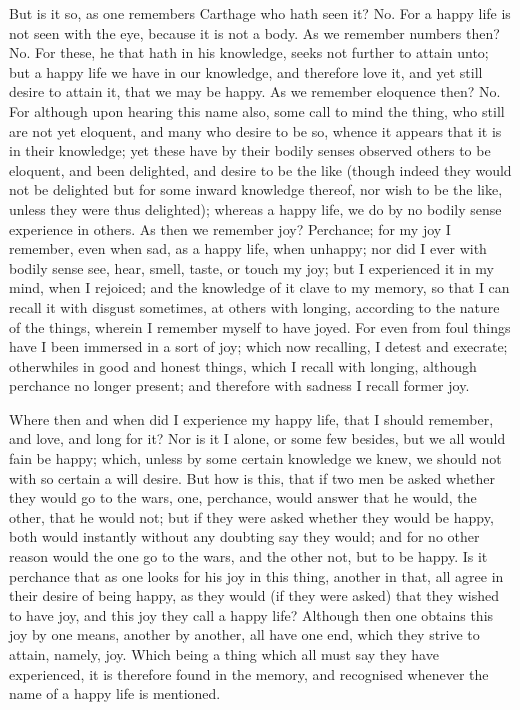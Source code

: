 \documentclass[b5paper,openright,12pt,twoside]{book}
\begin{document}
But is it so, as one remembers Carthage who hath seen it? No. For a
happy life is not seen with the eye, because it is not a body. As we
remember numbers then? No. For these, he that hath in his knowledge,
seeks not further to attain unto; but a happy life we have in our
knowledge, and therefore love it, and yet still desire to attain it,
that we may be happy. As we remember eloquence then? No. For although
upon hearing this name also, some call to mind the thing, who still are
not yet eloquent, and many who desire to be so, whence it appears that
it is in their knowledge; yet these have by their bodily senses observed
others to be eloquent, and been delighted, and desire to be the like
(though indeed they would not be delighted but for some inward knowledge
thereof, nor wish to be the like, unless they were thus delighted);
whereas a happy life, we do by no bodily sense experience in others. As
then we remember joy? Perchance; for my joy I remember, even when sad,
as a happy life, when unhappy; nor did I ever with bodily sense see,
hear, smell, taste, or touch my joy; but I experienced it in my mind,
when I rejoiced; and the knowledge of it clave to my memory, so that I
can recall it with disgust sometimes, at others with longing, according
to the nature of the things, wherein I remember myself to have joyed.
For even from foul things have I been immersed in a sort of joy; which
now recalling, I detest and execrate; otherwhiles in good and honest
things, which I recall with longing, although perchance no longer
present; and therefore with sadness I recall former joy.

Where then and when did I experience my happy life, that I should
remember, and love, and long for it? Nor is it I alone, or some few
besides, but we all would fain be happy; which, unless by some certain
knowledge we knew, we should not with so certain a will desire. But how
is this, that if two men be asked whether they would go to the wars,
one, perchance, would answer that he would, the other, that he would
not; but if they were asked whether they would be happy, both would
instantly without any doubting say they would; and for no other reason
would the one go to the wars, and the other not, but to be happy. Is it
perchance that as one looks for his joy in this thing, another in that,
all agree in their desire of being happy, as they would (if they were
asked) that they wished to have joy, and this joy they call a happy
life? Although then one obtains this joy by one means, another by
another, all have one end, which they strive to attain, namely, joy.
Which being a thing which all must say they have experienced, it is
therefore found in the memory, and recognised whenever the name of a
happy life is mentioned.
\end{document}
